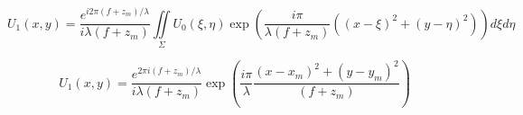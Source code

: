 \documentclass{kepfl}
\begin{document}
\begin{equation}
	{U_1}(x,y) = \frac{{{e^{i2\pi (f + {z_m})/\lambda }}}}{{i\lambda (f + {z_m})}}\iint\limits_\Sigma  {{U_0}(\xi ,\eta )\exp \left( {\frac{{i\pi }}{{\lambda (f + {z_m})}}\left( {{{(x - \xi )}^2} + {{(y - \eta )}^2}} \right)} \right)d\xi d\eta }
\end{equation}

\begin{equation}
	{U_1}(x,y) = \frac{{{e^{2\pi i(f + {z_m})/\lambda }}}}{{i\lambda (f + {z_m})}}\exp \left( {\frac{{i\pi }}{\lambda }\frac{{{{(x - {x_m})}^2} + {{(y - {y_m})}^2}}}{{(f + {z_m})}}} \right)
\end{equation}
\end{document}
